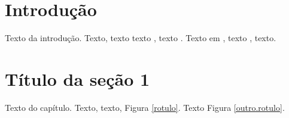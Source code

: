 \documentclass[a4paper,12pt,oneside,onecolumn,final,fleqn]{repUERJ}
\begin{document}
\chapter*{Introdução}

Texto da introdução. Texto, texto texto \cite{bib:Amado1991}, texto . Texto  em \citeyear{bib:Andrade1997}, texto \citeauthor{bib:Andrade1997},  texto.

\Blindtext %

\chapter{T\'itulo da seção 1}

Texto do capítulo. Texto, texto, Figura \ref{rotulo}. Texto Figura \ref{outro.rotulo}.
\end{document}

